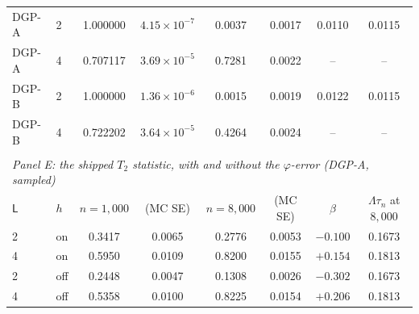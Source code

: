 \begin{tabular}{llcccccc}
\midrule
DGP-A & 2 & 1.000000 & $4.15\times10^{-7}$ & 0.0037 & 0.0017 & 0.0110 & 0.0115 \\
DGP-A & 4 & 0.707117 & $3.69\times10^{-5}$ & 0.7281 & 0.0022 & -- & -- \\
DGP-B & 2 & 1.000000 & $1.36\times10^{-6}$ & 0.0015 & 0.0019 & 0.0122 & 0.0115 \\
DGP-B & 4 & 0.722202 & $3.64\times10^{-5}$ & 0.4264 & 0.0024 & -- & -- \\
\\[0.5em]
\multicolumn{8}{l}{\textit{Panel E: the shipped $T_2$ statistic, with and without the $\varphi$-error (DGP-A, sampled)}} \\
\midrule
$\mathsf L$ & $h$ & $n=1{,}000$ & (MC SE) & $n=8{,}000$ & (MC SE) & $\beta$ & $\Lambda\tau_n$ at $8{,}000$ \\
\midrule
2 & on & 0.3417 & 0.0065 & 0.2776 & 0.0053 & $-0.100$ & 0.1673 \\
4 & on & 0.5950 & 0.0109 & 0.8200 & 0.0155 & $+0.154$ & 0.1813 \\
2 & off & 0.2448 & 0.0047 & 0.1308 & 0.0026 & $-0.302$ & 0.1673 \\
4 & off & 0.5358 & 0.0100 & 0.8225 & 0.0154 & $+0.206$ & 0.1813 \\
\bottomrule
\end{tabular}
